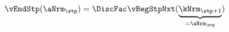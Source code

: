   \begin{equation}\begin{gathered}\begin{aligned}
\vEndStp(\aNrm_{\stp}) & = \DiscFac \vBegStpNxt(\underbrace{\kNrm_{\stp+1}}_{=\aNrm_{\stp}}) \label{eq:vEndStp}
      \end{aligned}\end{gathered}\end{equation}
